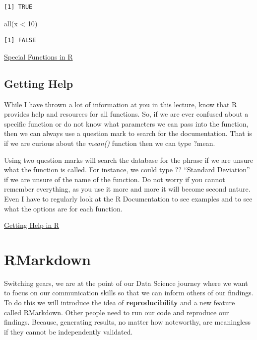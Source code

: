 \documentclass[
  letterpaper,
  DIV=11,
  numbers=noendperiod]{scrreprt}
\newenvironment{Shaded}{\begin{snugshade}}{\end{snugshade}}
\newcommand{\DecValTok}[1]{\textcolor[rgb]{0.68,0.00,0.00}{#1}}
\newcommand{\FunctionTok}[1]{\textcolor[rgb]{0.28,0.35,0.67}{#1}}
\newcommand{\NormalTok}[1]{\textcolor[rgb]{0.00,0.23,0.31}{#1}}
\newcommand{\SpecialCharTok}[1]{\textcolor[rgb]{0.37,0.37,0.37}{#1}}
\begin{document}
\begin{verbatim}
[1] TRUE
\end{verbatim}

\begin{Shaded}
\begin{Highlighting}[]
\FunctionTok{all}\NormalTok{(x }\SpecialCharTok{\textless{}} \DecValTok{10}\NormalTok{)}
\end{Highlighting}
\end{Shaded}

\begin{verbatim}
[1] FALSE
\end{verbatim}

\begin{watch}{}{}
    \href{https://youtu.be/46XJpsU2A6k}{Special Functions in R}
\end{watch}

\section{Getting Help}\label{getting-help}

While I have thrown a lot of information at you in this lecture, know
that R provides help and resources for all functions. So, if we are ever
confused about a specific function or do not know what parameters we can
pass into the function, then we can always use a question mark to search
for the documentation. That is if we are curious about the \emph{mean()}
function then we can type ?mean.

Using two question marks will search the database for the phrase if we
are unsure what the function is called. For instance, we could type ??
``Standard Deviation'' if we are unsure of the name of the function. Do
not worry if you cannot remember everything, as you use it more and more
it will become second nature. Even I have to regularly look at the R
Documentation to see examples and to see what the options are for each
function.

\begin{watch}{}{}
    \href{https://youtu.be/SE8j5P77XUo}{Getting Help in R}
\end{watch}


\chapter{RMarkdown}\label{rmarkdown}

Switching gears, we are at the point of our Data Science journey where
we want to focus on our communication skills so that we can inform
others of our findings. To do this we will introduce the idea of
\textbf{reproducibility} and a new feature called RMarkdown. Other
people need to run our code and reproduce our findings. Because,
generating results, no matter how noteworthy, are meaningless if they
cannot be independently validated.
\end{document}
